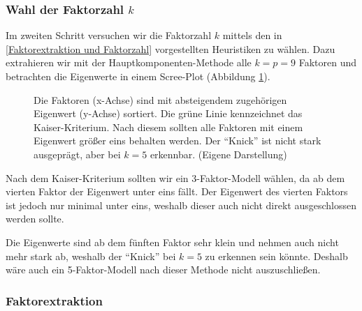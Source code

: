 \documentclass[11pt]{scrartcl}
\begin{document}
	\subsubsection*{Wahl der Faktorzahl $k$}
	
	Im zweiten Schritt versuchen wir die Faktorzahl $k$ mittels den in \ref{Faktorextraktion und Faktorzahl} vorgestellten Heuristiken zu wählen. Dazu extrahieren wir mit der Hauptkomponenten-Methode alle $k=p=9$ Faktoren und betrachten die Eigenwerte in einem Scree-Plot (Abbildung \ref{fig:Scree-Plot}). 
	\begin{figure}[h]
		\centering
		
		\caption[Scree-Plot]{Die Faktoren (x-Achse) sind mit absteigendem
			zugehörigen Eigenwert (y-Achse) sortiert. Die grüne Linie kennzeichnet das Kaiser-Kriterium.
			Nach diesem sollten alle Faktoren mit einem Eigenwert größer eins behalten werden. Der \enquote{Knick}
			ist nicht stark ausgeprägt, aber bei $k=5$ erkennbar. (Eigene Darstellung)}
		\label{fig:Scree-Plot}
	\end{figure}
	Nach dem Kaiser-Kriterium sollten wir ein 3-Faktor-Modell
	wählen, da ab dem vierten Faktor der Eigenwert unter eins fällt. Der Eigenwert des vierten Faktors ist jedoch nur minimal unter eins, weshalb dieser auch nicht direkt ausgeschlossen werden sollte. 
	
	Die Eigenwerte sind ab dem fünften Faktor sehr klein und nehmen auch nicht mehr stark ab, weshalb der \enquote{Knick}  bei $k=5$ zu erkennen sein könnte. Deshalb wäre auch ein
	5-Faktor-Modell nach dieser Methode nicht auszuschließen.
	
	\subsubsection*{Faktorextraktion}
	
\end{document}

